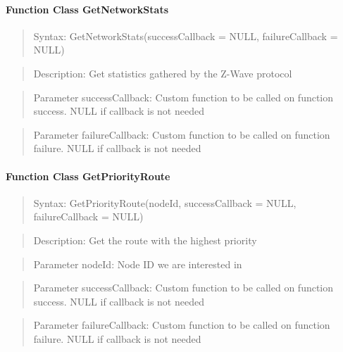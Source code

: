 \paragraph{Function Class GetNetworkStats}
\begin{quote}Syntax: GetNetworkStats(successCallback = NULL, failureCallback = NULL)\end{quote}
\begin{quote}Description: Get statistics gathered by the Z-Wave protocol\end{quote}
\begin{quote}Parameter successCallback: Custom function to be called on function success. NULL if callback is not needed\end{quote}
\begin{quote}Parameter failureCallback: Custom function to be called on function failure. NULL if callback is not needed\end{quote}


\paragraph{Function Class GetPriorityRoute}
\begin{quote}Syntax: GetPriorityRoute(nodeId, successCallback = NULL, failureCallback = NULL)\end{quote}
\begin{quote}Description: Get the route with the highest priority\end{quote}
\begin{quote}Parameter nodeId: Node ID we are interested in\end{quote}
\begin{quote}Parameter successCallback: Custom function to be called on function success. NULL if callback is not needed\end{quote}
\begin{quote}Parameter failureCallback: Custom function to be called on function failure. NULL if callback is not needed\end{quote}


